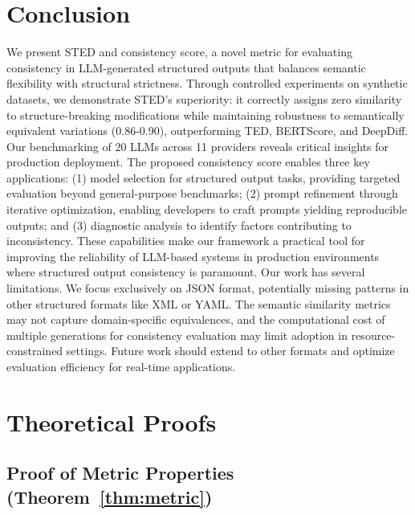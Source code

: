\documentclass{article}
\begin{document}
\section{Conclusion}
We present STED and consistency score, a novel metric for evaluating consistency in LLM-generated structured outputs that balances semantic flexibility with structural strictness. Through controlled experiments on synthetic datasets, we demonstrate STED's superiority: it correctly assigns zero similarity to structure-breaking modifications while maintaining robustness to semantically equivalent variations (0.86-0.90), outperforming TED, BERTScore, and DeepDiff.
Our benchmarking of 20 LLMs across 11 providers reveals critical insights for production deployment. The proposed consistency score enables three key applications: (1) model selection for structured output tasks, providing targeted evaluation beyond general-purpose benchmarks; (2) prompt refinement through iterative optimization, enabling developers to craft prompts yielding reproducible outputs; and (3) diagnostic analysis to identify factors contributing to inconsistency. These capabilities make our framework a practical tool for improving the reliability of LLM-based systems in production environments where structured output consistency is paramount.
Our work has several limitations. We focus exclusively on JSON format, potentially missing patterns in other structured formats like XML or YAML. The semantic similarity metrics may not capture domain-specific equivalences, and the computational cost of multiple generations for consistency evaluation may limit adoption in resource-constrained settings. Future work should extend to other formats and optimize evaluation efficiency for real-time applications.




\appendix

\section{Theoretical Proofs}
\label{sec:proofs}

\subsection{Proof of Metric Properties (Theorem~\ref{thm:metric})}
\label{sec:metric-proof}
\end{document}
